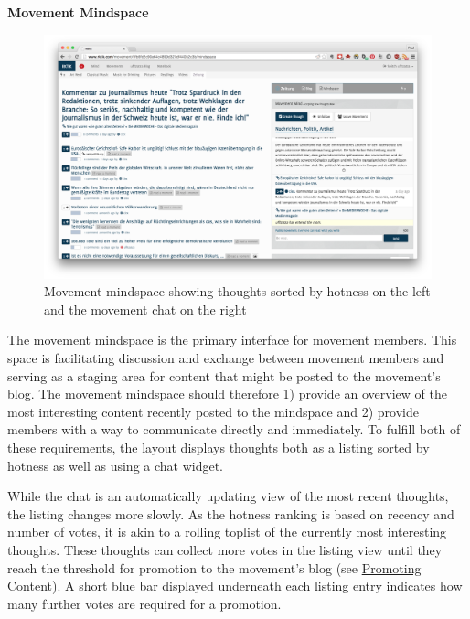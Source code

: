 \textbf{Movement Mindspace}

\begin{figure}[htbp]
\centering
\includegraphics{img/mindspace.png}
\caption{Movement mindspace showing thoughts sorted by hotness on the
left and the movement chat on the right}
\end{figure}

The movement mindspace is the primary interface for movement members.
This space is facilitating discussion and exchange between movement
members and serving as a staging area for content that might be posted
to the movement's blog. The movement mindspace should therefore 1)
provide an overview of the most interesting content recently posted to
the mindspace and 2) provide members with a way to communicate directly
and immediately. To fulfill both of these requirements, the layout
displays thoughts both as a listing sorted by hotness as well as using a
chat widget.

While the chat is an automatically updating view of the most recent
thoughts, the listing changes more slowly. As the hotness ranking is
based on recency and number of votes, it is akin to a rolling toplist of
the currently most interesting thoughts. These thoughts can collect more
votes in the listing view until they reach the threshold for promotion
to the movement's blog (see \hyperref[promoting-content]{Promoting
Content}). A short blue bar displayed underneath each listing entry
indicates how many further votes are required for a promotion.


